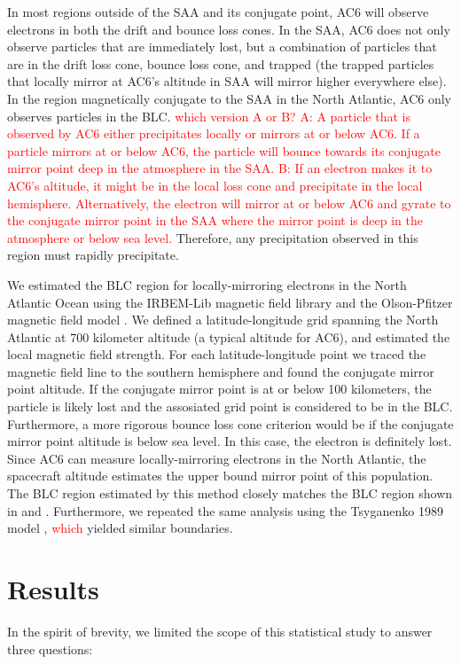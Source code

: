 \documentclass[draft]{agujournal2019}
\begin{document}
In most regions outside of the SAA and its conjugate point, AC6 will observe electrons in both the drift and bounce loss cones. In the SAA, AC6 does not only observe particles that are immediately lost, but a combination of particles that are in the drift loss cone, bounce loss cone, and trapped (the trapped particles that locally mirror at AC6's altitude in SAA will mirror higher everywhere else). In the region magnetically conjugate to the SAA in the North Atlantic, AC6 only observes particles in the BLC. \textcolor{red}{which version A or B? A: A particle that is observed by AC6 either precipitates locally or mirrors at or below AC6. If a particle mirrors at or below AC6, the particle will bounce towards its conjugate mirror point deep in the atmosphere in the SAA. \newline B: If an electron makes it to AC6's altitude, it might be in the local loss cone and precipitate in the local hemisphere. Alternatively, the electron will mirror at or below AC6 and gyrate to the conjugate mirror point in the SAA where the mirror point is deep in the atmosphere or below sea level.} Therefore, any precipitation observed in this region must rapidly precipitate. 

We estimated the BLC region for locally-mirroring electrons in the North Atlantic Ocean using the IRBEM-Lib magnetic field library and the Olson-Pfitzer magnetic field model \cite{irbem, Olson1982}. We defined a latitude-longitude grid spanning the North Atlantic at 700 kilometer altitude (a typical altitude for AC6), and estimated the local magnetic field strength. For each latitude-longitude point we traced the magnetic field line to the southern hemisphere and found the conjugate mirror point altitude. If the conjugate mirror point is at or below 100 kilometers, the particle is likely lost and the assosiated grid point is considered to be in the BLC. Furthermore, a more rigorous bounce loss cone criterion would be if the conjugate mirror point altitude is below sea level. In this case, the electron is definitely lost. Since AC6 can measure locally-mirroring electrons in the North Atlantic, the spacecraft altitude estimates the upper bound mirror point of this population. The BLC region estimated by this method closely matches the BLC region shown in  and . Furthermore, we repeated the same analysis using the Tsyganenko 1989 model \cite{Tsyganenko1989}, \textcolor{red}{which} yielded similar boundaries.

\section{Results} \label{results}
In the spirit of brevity, we limited the scope of this statistical study to answer three questions:
\end{document}
